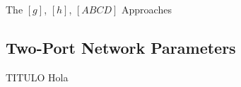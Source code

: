 
\begin{frame}[allowframebreaks]{The $[g]$, $[h]$, $[ABCD]$ Approaches}
  
  
\end{frame}
  


\subsection{Two-Port Network Parameters}

\begin{frame}{TITULO}
  Hola
\end{frame}


